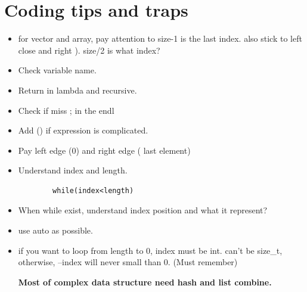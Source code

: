 \documentclass[a4paper,11pt,twoside]{book}
\begin{document}
\section{Coding tips and traps}
\begin{itemize}
	\item for vector and array, pay attention to size-1 is the last index. also stick to left close and right ).  size/2 is what index?  
	\item Check variable name. 
	\item Return in lambda and recursive. 
	\item Check if miss ; in the endl
	\item Add () if expression is complicated. 
	\item Pay left edge (0) and right edge ( last element)
	\item Understand index and length. 
	\begin{lstlisting}
		while(index<length)
	\end{lstlisting}
	\item When while exist, understand index position and what it represent?
	\item use auto as possible.
	
	\item if you want to loop from length to 0, index must be int. can't be size\_t, otherwise, --index will never small than 0. (Must remember)
	
	\textbf{Most of complex data structure need hash and list combine.}
\end{itemize}

\end{document}
